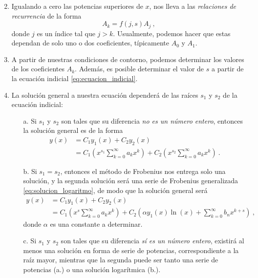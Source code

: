 \begin{propo}
\begin{enumerate}
\begin{equation}
        \end{equation}
        \item Igualando a cero las potencias superiores de $x$, nos lleva a las \emph{relaciones de recurrencia} de la forma
        \begin{equation}
            A_k = f(j,s) A_j \ ,
        \end{equation}
        donde $j$ es un índice tal que $j > k$. Usualmente, podemos hacer que estas dependan de solo uno o dos coeficientes, típicamente $A_0$ y $A_1$.
        \item A partir de nuestras condiciones de contorno, podemos determinar los valores de los coeficientes $A_k$. Además, es posible determinar el valor de $s$ a partir de la ecuación indicial \eqref{eq:ecuacion_indicial}.
        \item La solución general a nuestra ecuación dependerá de las raíces $s_1$ y $s_2$ de la ecuación indicial:
        \begin{itemize}
            \item[a.] Si $s_1$ y $s_2$ son tales que su diferencia \emph{no es un número entero}, entonces la solución general es de la forma
            \begin{align}
                y(x) & = C_1 y_1(x) + C_2 y_2(x) \nonumber \\
                & = C_1 \left( x^{s_1} \sum_{k=0}^\infty a_k x^k \right) + C_2 \left( x^{s_2} \sum_{k=0}^\infty a_k x^k \right)  \ .
            \end{align}
            \item[b.] Si $s_1 = s_2$, entonces el método de Frobenius nos entrega solo una solución, y la segunda solución será una serie de Frobenius generalizada \eqref{eq:solucion_logaritmo}, de modo que la solución general será
            \begin{align}
                y(x) & = C_1 y_1(x) + C_2 y_2(x) \nonumber \\
                & = C_1 \left( x^{s} \sum_{k=0}^\infty a_k x^k \right) + C_2 \left( \alpha y_1(x) \ln(x) + \sum_{k=0}^\infty b_n x^{k+s}  \right) \ ,
            \end{align}
            donde $\alpha$ es una constante a determinar.
            \item[c.] Si $s_1$ y $s_2$ son tales que su diferencia \emph{sí es un número entero}, existirá al menos una solución en forma de serie de potencias, correspondiente a la raíz mayor, mientras que la segunda puede ser tanto una serie de potencias (a.) o una solución logarítmica (b.).  
        \end{itemize}
    \end{enumerate}
\end{propo}

